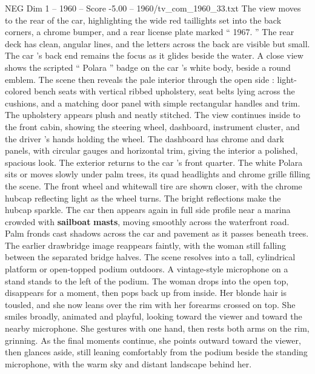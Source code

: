 \begin{textsample}{NEG Dim 1 – 1960 – Score -5.00 – 1960/tv\_com\_1960\_33.txt}
The view moves to the rear of the car, highlighting the wide red taillights set into the back corners, a chrome bumper, and a rear license plate marked “ 1967. ” The rear deck has clean, angular lines, and the letters across the back are visible but small.
The car ’s back end remains the focus as it glides beside the water.
A close view shows the scripted “ Polara ” badge on the car ’s white body, beside a round emblem.
The scene then reveals the pale interior through the open side : light-colored bench seats with vertical ribbed upholstery, seat belts lying across the cushions, and a matching door panel with simple rectangular handles and trim.
The upholstery appears plush and neatly stitched.
The view continues inside to the front cabin, showing the steering wheel, dashboard, instrument cluster, and the driver ’s hands holding the wheel.
The dashboard has chrome and dark panels, with circular gauges and horizontal trim, giving the interior a polished, spacious look.
The exterior returns to the car ’s front quarter.
The white Polara sits or moves slowly under palm trees, its quad headlights and chrome grille filling the scene.
The front wheel and whitewall tire are shown closer, with the chrome hubcap reflecting light as the wheel turns.
The bright reflections make the hubcap sparkle.
The car then appears again in full side profile near a marina crowded with \textbf{sailboat} \textbf{masts}, moving smoothly across the waterfront road.
Palm fronds cast shadows across the car and pavement as it passes beneath trees.
The earlier drawbridge image reappears faintly, with the woman still falling between the separated bridge halves.
The scene resolves into a tall, cylindrical platform or open-topped podium outdoors.
A vintage-style microphone on a stand stands to the left of the podium.
The woman drops into the open top, disappears for a moment, then pops back up from inside.
Her blonde hair is tousled, and she now leans over the rim with her forearms crossed on top.
She smiles broadly, animated and playful, looking toward the viewer and toward the nearby microphone.
She gestures with one hand, then rests both arms on the rim, grinning.
As the final moments continue, she points outward toward the viewer, then glances aside, still leaning comfortably from the podium beside the standing microphone, with the warm sky and distant landscape behind her.

\end{textsample}
